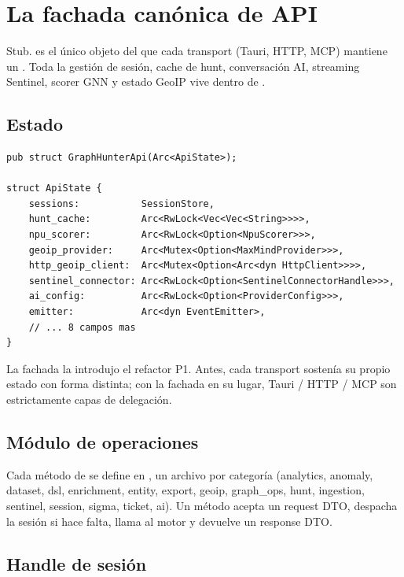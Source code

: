 \chapter{La fachada canónica de API}
\label{ch:api-facade}

\begin{note}
Stub.  es el único objeto del que cada
transport (Tauri, HTTP, MCP) mantiene un . Toda la
gestión de sesión, cache de hunt, conversación AI, streaming
Sentinel, scorer GNN y estado GeoIP vive dentro de .
\end{note}

\section{Estado}

\begin{lstlisting}[style=rust]
pub struct GraphHunterApi(Arc<ApiState>);

struct ApiState {
    sessions:           SessionStore,
    hunt_cache:         Arc<RwLock<Vec<Vec<String>>>>,
    npu_scorer:         Arc<RwLock<Option<NpuScorer>>>,
    geoip_provider:     Arc<Mutex<Option<MaxMindProvider>>>,
    http_geoip_client:  Arc<Mutex<Option<Arc<dyn HttpClient>>>>,
    sentinel_connector: Arc<RwLock<Option<SentinelConnectorHandle>>>,
    ai_config:          Arc<RwLock<Option<ProviderConfig>>>,
    emitter:            Arc<dyn EventEmitter>,
    // ... 8 campos mas
}
\end{lstlisting}

La fachada la introdujo el refactor P1. Antes, cada transport
sostenía su propio estado con forma distinta; con la fachada en
su lugar, Tauri / HTTP / MCP son estrictamente capas de
delegación.

\section{Módulo de operaciones}

Cada método de  se define en
, un archivo por
categoría (analytics, anomaly, dataset, dsl, enrichment,
entity, export, geoip, graph\_ops, hunt, ingestion, sentinel,
session, sigma, ticket, ai). Un método acepta un request DTO,
despacha la sesión si hace falta, llama al motor y devuelve un
response DTO.

\section{Handle de sesión}

